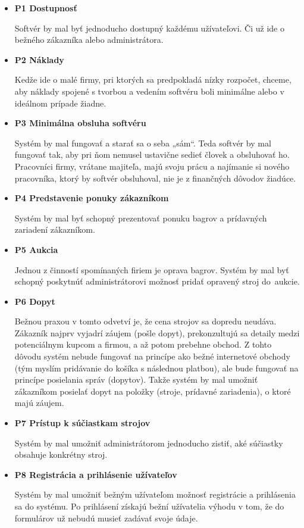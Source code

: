 \begin{itemize}
\item \textbf{P1 Dostupnosť}

Softvér by mal byť jednoducho dostupný každému užívateľovi. Či už ide o bežného zákazníka alebo administrátora.

\item \textbf{P2 Náklady}

Kedže ide o malé firmy, pri ktorých sa predpokladá nízky rozpočet, chceme, aby náklady spojené s tvorbou a vedením softvéru boli minimálne alebo v ideálnom prípade žiadne.

\item \textbf{P3 Minimálna obsluha softvéru}

Systém by mal fungovať a starať sa o seba „sám“. Teda softvér by mal fungovať tak, aby pri ňom nemusel ustavične sedieť človek a obsluhovať ho. Pracovníci firmy, vrátane majiteľa, majú svoju prácu a najímanie si nového pracovníka, ktorý by softvér obsluhoval, nie je z finančných dôvodov žiadúce.

\item \textbf{P4 Predstavenie ponuky zákazníkom}

Systém by mal byť schopný prezentovať ponuku bagrov a prídavných za\-ria\-de\-ní zákazníkom.

\item \textbf{P5 Aukcia}

Jednou z činností spomínaných firiem je oprava bagrov. Systém by mal byť schopný poskytnúť administrátorovi možnosť pridať opravený stroj do~au\-kci\-e.

\item \textbf{P6 Dopyt}

Bežnou praxou v tomto odvetví je, že cena strojov sa dopredu neudáva. Zákazník najprv vyjadrí záujem (pošle dopyt), prekonzultujú sa detaily medzi potenciálnym kupcom a firmou, a až potom prebehne obchod. Z tohto dôvodu systém nebude fungovať na princípe ako bežné internetové obchody (tým myslím pridávanie do košíka s následnou platbou), ale bude fungovať na princípe posielania správ (dopytov). Takže systém by mal umožniť zákazníkom posielať dopyt na položky (stroje, prídavné zariadenia), o ktoré majú záujem.

\item \textbf{P7 Prístup k súčiastkam strojov}

Systém by mal umožniť administrátorom jednoducho zistiť, aké súčiastky obsahuje konkrétny stroj. 

\item \textbf{P8 Registrácia a prihlásenie užívateľov}

Systém by mal umožniť bežným užívateľom možnosť registrácie a pri\-hlá\-se\-nia sa do systému. Po prihlásení získajú bežní užívatelia výhodu v tom, že do formulárov už nebudú musieť zadávať svoje údaje.
\end{itemize}


